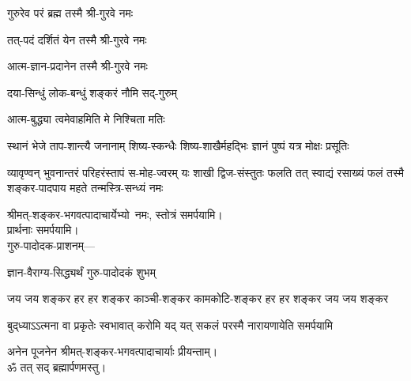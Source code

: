 \begin{center}
{गुरुरेव परं ब्रह्म तस्मै श्री-गुरवे नमः}

{तत्-पदं दर्शितं येन तस्मै श्री-गुरवे नमः}

{आत्म-ज्ञान-प्रदानेन तस्मै श्री-गुरवे नमः}

{दया-सिन्धुं लोक-बन्धुं शङ्करं नौमि सद्-गुरुम्}

{आत्म-बुद्ध्या त्वमेवाहमिति मे निश्चिता मतिः}

{स्थानं भेजे ताप-शान्त्यै जनानाम्}
{शिष्य-स्कन्धैः शिष्य-शाखैर्महद्भिः}
{ज्ञानं पुष्पं यत्र मोक्षः प्रसूतिः}

{व्यावृण्वन् भुवनान्तरं परिहरंस्तापं स-मोह-ज्वरम्}
{यः शाखी द्विज-संस्तुतः फलति तत् स्वाद्यं रसाख्यं फलं}
{तस्मै शङ्कर-पादपाय महते तन्मस्त्रि-सन्ध्यं नमः}

श्रीमत्-शङ्कर-भगवत्पादाचार्येभ्यो~नमः, स्तोत्रं समर्पयामि।\\

प्रार्थनाः समर्पयामि।\\

{गुरु-पादोदक-प्राशनम्\textsf{---}\hfill}

{ज्ञान-वैराग्य-सिद्ध्यर्थं गुरु-पादोदकं शुभम्}

\closesection







{जय जय शङ्कर हर हर शङ्कर}
{काञ्ची-शङ्कर कामकोटि-शङ्कर}
{हर हर शङ्कर जय जय शङ्कर}

{बुद्‌ध्याऽऽत्मना वा प्रकृतेः स्वभावात्}
{करोमि यद् यत् सकलं परस्मै}
{नारायणायेति समर्पयामि}

अनेन पूजनेन श्रीमत्-शङ्कर-भगवत्पादाचार्याः प्रीयन्ताम्। \\

ॐ तत् सद् ब्रह्मार्पणमस्तु।

\closesection



\end{center}
\closesection

